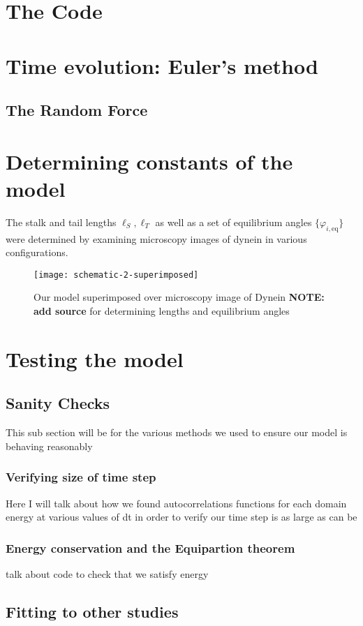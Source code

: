 	
\section{The Code}
	\section{Time evolution: Euler's method}
	\subsection{The Random Force}
\section{Determining constants of the model}
The stalk and tail lengths $\ell_S, \ell_T$ as well as a set of equilibrium angles $\{\varphi_{i,\text{eq}}\}$ were determined by examining microscopy images of dynein in various configurations. 
\begin{figure}[hbt!]
	\centering
	\texttt{[image: schematic-2-superimposed]}
	\caption{Our model superimposed over microscopy image of Dynein \textbf{NOTE: add source} for determining lengths and equilibrium angles} 
	\label{fig:superimpmosed}
\end{figure}

\section{Testing the model} 
\subsection{Sanity Checks}
This sub section will be for the various methods we used to ensure our model is behaving reasonably 
\subsubsection{Verifying size of time step} 
Here I will talk about how we found autocorrelations functions for each domain energy at various values of dt in order to verify our time step is as large as can be
\subsubsection{Energy conservation and the Equipartion theorem} 
talk about code to check that we satisfy energy 
\subsection{Fitting to other studies} 	